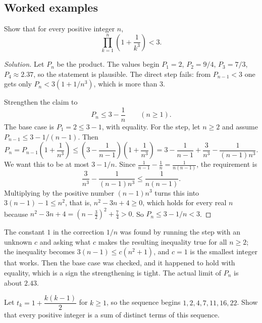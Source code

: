 \subsection*{Worked examples}

\begin{example}
Show that for every positive integer $n$,
\[
\prod_{k=1}^{n} \left(1 + \frac{1}{k^3}\right) < 3 .
\]
\end{example}

\begin{proof}[Solution]
Let $P_n$ be the product. The values begin $P_1 = 2$, $P_2 = 9/4$, $P_3 = 7/3$, $P_4 \approx 2.37$, so the statement is plausible. The direct step fails: from $P_{n-1} < 3$ one gets only $P_n < 3(1 + 1/n^3)$, which is more than $3$.

Strengthen the claim to
\[
P_n \le 3 - \frac{1}{n} \qquad (n \ge 1).
\]
The base case is $P_1 = 2 \le 3 - 1$, with equality. For the step, let $n \ge 2$ and assume $P_{n-1} \le 3 - 1/(n-1)$. Then
\[
P_n = P_{n-1}\left(1 + \frac{1}{n^3}\right) \le \left(3 - \frac{1}{n-1}\right)\left(1 + \frac{1}{n^3}\right)
= 3 - \frac{1}{n-1} + \frac{3}{n^3} - \frac{1}{(n-1)n^3}.
\]
We want this to be at most $3 - 1/n$. Since $\frac{1}{n-1} - \frac{1}{n} = \frac{1}{n(n-1)}$, the requirement is
\[
\frac{3}{n^3} - \frac{1}{(n-1)n^3} \le \frac{1}{n(n-1)} .
\]
Multiplying by the positive number $(n-1) n^3$ turns this into $3(n-1) - 1 \le n^2$, that is, $n^2 - 3n + 4 \ge 0$, which holds for every real $n$ because $n^2 - 3n + 4 = (n - \tfrac32)^2 + \tfrac74 > 0$. So $P_n \le 3 - 1/n < 3$.
\end{proof}

The constant $1$ in the correction $1/n$ was found by running the step with an unknown $c$ and asking what $c$ makes the resulting inequality true for all $n \ge 2$; the inequality becomes $3(n-1) \le c(n^2 + 1)$, and $c = 1$ is the smallest integer that works. Then the base case was checked, and it happened to hold with equality, which is a sign the strengthening is tight. The actual limit of $P_n$ is about $2.43$.

\begin{example}
Let $t_k = 1 + \dfrac{k(k-1)}{2}$ for $k \ge 1$, so the sequence begins $1, 2, 4, 7, 11, 16, 22$. Show that every positive integer is a sum of distinct terms of this sequence.
\end{example}


